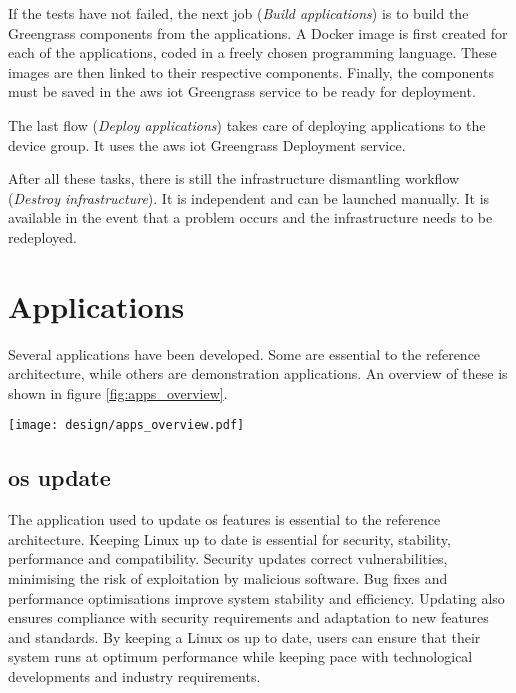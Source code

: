 If the tests have not failed, the next job (\textit{Build applications}) is to build the Greengrass components from the applications. A Docker image is first created for each of the applications, coded in a freely chosen programming language. These images are then linked to their respective components. Finally, the components must be saved in the \gls{aws} \acrshort{iot} Greengrass service to be ready for deployment.

The last flow (\textit{Deploy applications}) takes care of deploying applications to the device group. It uses the \gls{aws} \acrshort{iot} Greengrass Deployment service.

After all these tasks, there is still the infrastructure dismantling workflow (\textit{Destroy infrastructure}). It is independent and can be launched manually. It is available in the event that a problem occurs and the infrastructure needs to be redeployed.

\section{Applications}

Several applications have been developed. Some are essential to the reference architecture, while others are demonstration applications. An overview of these is shown in figure \ref{fig:apps_overview}.
\begin{center}
    \begingroup
    \texttt{[image: design/apps\_overview.pdf]}
    \label{fig:apps_overview}
    \endgroup
\end{center}

\subsection{\acrshort{os} update}
The application used to update \acrlong{os} features is essential to the reference architecture. Keeping Linux up to date is essential for security, stability, performance and compatibility. Security updates correct vulnerabilities, minimising the risk of exploitation by malicious software. Bug fixes and performance optimisations improve system stability and efficiency. Updating also ensures compliance with security requirements and adaptation to new features and standards. By keeping a Linux \acrshort{os} up to date, users can ensure that their system runs at optimum performance while keeping pace with technological developments and industry requirements.

